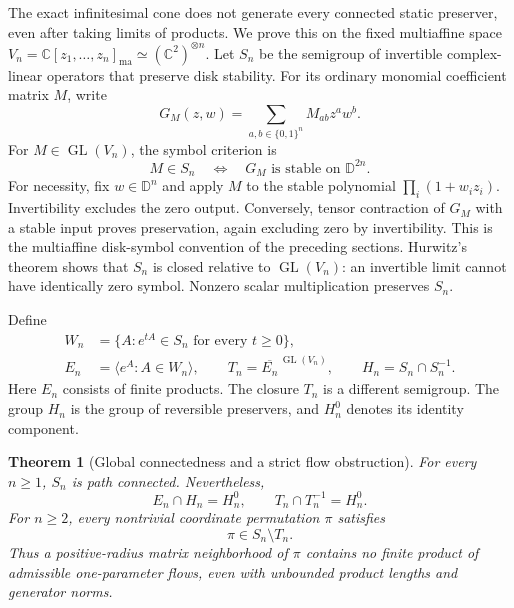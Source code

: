 \documentclass[reqno]{amsart}
\newtheorem{theorem}{Theorem}[section]
\theoremstyle{definition}
\theoremstyle{remark}
\newcommand{\C}{\mathbb C}
\newcommand{\D}{\mathbb D}
\begin{document}
The exact infinitesimal cone does not generate every connected static
preserver, even after taking limits of products.  We prove this on the
fixed multiaffine space
$V_n=\C[z_1,\ldots,z_n]_{\mathrm{ma}}\simeq(\C^2)^{\otimes n}$.
Let $S_n$ be the semigroup of invertible complex-linear operators that
preserve disk stability.  For its ordinary monomial coefficient matrix
$M$, write
\begin{equation}\label{glob:symbol}
 G_M(z,w)=\sum_{a,b\in\{0,1\}^n}M_{ab}z^aw^b.
\end{equation}
For \(M\in\operatorname{GL}(V_n)\), the symbol criterion is
\begin{equation}\label{glob:symbol-equivalence}
 M\in S_n\quad\Longleftrightarrow\quad
 G_M\text{ is stable on }\D^{2n}.
\end{equation}
For necessity, fix $w\in\D^n$ and apply $M$ to the stable polynomial
$\prod_i(1+w_iz_i)$.  Invertibility excludes the zero output.
Conversely, tensor contraction of $G_M$ with a stable input proves
preservation, again excluding zero by invertibility.  This is the
multiaffine disk-symbol convention of the preceding sections.
Hurwitz's theorem shows that $S_n$ is closed relative to
$\operatorname{GL}(V_n)$: an invertible limit cannot have identically
zero symbol.  Nonzero scalar multiplication preserves $S_n$.

Define
\begin{equation}\label{glob:semigroups}
 \begin{split}
 W_n&=\{A:e^{tA}\in S_n\text{ for every }t\geq0\},\\
 E_n&=\langle e^A:A\in W_n\rangle,\qquad
 T_n=\overline{E_n}^{\,\operatorname{GL}(V_n)},\qquad
 H_n=S_n\cap S_n^{-1}.
 \end{split}
\end{equation}
Here $E_n$ consists of finite products.  The closure $T_n$ is a
different semigroup.  The group $H_n$ is the group of reversible
preservers, and $H_n^0$ denotes its identity component.

\begin{theorem}[Global connectedness and a strict flow obstruction]
\label{glob:main}
For every $n\geq1$, $S_n$ is path connected.  Nevertheless,
\begin{equation}\label{glob:reversible-parts}
 E_n\cap H_n=H_n^0,
 \qquad T_n\cap T_n^{-1}=H_n^0.
\end{equation}
For $n\geq2$, every nontrivial coordinate permutation $\pi$ satisfies
\begin{equation}\label{glob:permutation-obstruction}
 \pi\in S_n\setminus T_n.
\end{equation}
Thus a positive-radius matrix neighborhood of $\pi$ contains no finite
product of admissible one-parameter flows, even with unbounded product
lengths and generator norms.
\end{theorem}
\end{document}
